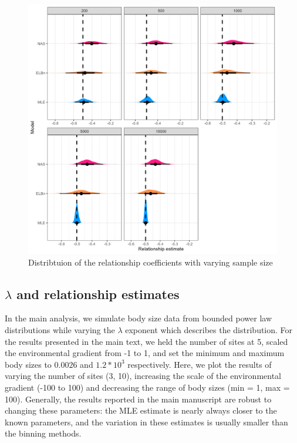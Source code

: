 \documentclass[
]{article}
\begin{document}
\newpage

\begin{figure}
\centering
\includegraphics{figures/n_vary_relationship_density.png}
\caption{Distribtuion of the relationship coefficients with varying
sample size}
\end{figure}

\newpage

\hypertarget{lambda-and-relationship-estimates}{%
\subsection{\texorpdfstring{\(\lambda\) and relationship
estimates}{\textbackslash lambda and relationship estimates}}\label{lambda-and-relationship-estimates}}

In the main analysis, we simulate body size data from bounded power law
distributions while varying the \(\lambda\) exponent which describes the
distribution. For the results presented in the main text, we held the
number of sites at 5, scaled the environmental gradient from -1 to 1,
and set the minimum and maximum body sizes to \(0.0026\) and
\(1.2 *10^3\) respectively. Here, we plot the results of varying the
number of sites (3, 10), increasing the scale of the environmental
gradient (-100 to 100) and decreasing the range of body sizes (min = 1,
max = 100). Generally, the results reported in the main manuscript are
robust to changing these parameters: the MLE estimate is nearly always
closer to the known parameters, and the variation in these estimates is
usually smaller than the binning methods.
\end{document}
